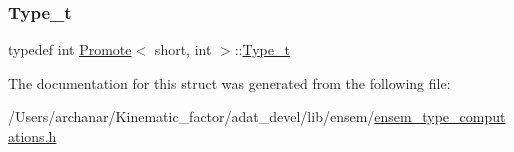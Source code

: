 \subsubsection{\texorpdfstring{Type\_t}{Type\_t}\hspace{0.1cm}{\footnotesize\ttfamily [2/2]}}
{\footnotesize\ttfamily typedef int \mbox{\hyperlink{structPromote}{Promote}}$<$ short, int $>$\+::\mbox{\hyperlink{structPromote_3_01short_00_01int_01_4_a4c576886bac5096bb59339397d07ab38}{Type\+\_\+t}}}



The documentation for this struct was generated from the following file\+:\begin{DoxyCompactItemize}
\item 
/\+Users/archanar/\+Kinematic\+\_\+factor/adat\+\_\+devel/lib/ensem/\mbox{\hyperlink{lib_2ensem_2ensem__type__computations_8h}{ensem\+\_\+type\+\_\+computations.\+h}}\end{DoxyCompactItemize}
